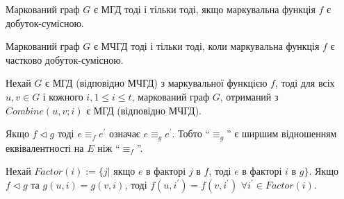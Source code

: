 \begin{lemma}
  Маркований граф $G$ є МГД тоді і тільки тоді, якщо маркувальна функція $f$ є добуток-сумісною. 
\end{lemma}

\begin{lemma}
  Маркований граф $G$ є МЧГД тоді і тільки тоді, коли маркувальна функція $f$ є частково добуток-сумісною.
\end{lemma}

\begin{lemma}
  Нехай $G$ є МГД (відповідно МЧГД) з маркувальної функцією $f$, тоді для всіх $u,v \in G$ і кожного $i, 1 \le i \le t$, маркований граф $G$, отриманий з $Combine(u,v;i)$ є МГД (відповідно МЧГД).
\end{lemma}

\begin{lemma}
  Якщо $f \triangleleft g$ тоді $e \equiv_f e^\prime$ означає $e \equiv_g e^\prime$. Тобто ``$\equiv_g$'' є ширшим відношенням еквівалентності на $E$ ніж ``$\equiv_f$''.
\end{lemma}

\begin{lemma}
  Нехай $Factor(i):=\lbrace j \vert$ якщо $e$ в факторі $j$ в $f$, тоді $e$ в факторі $i$ в $g \rbrace$. Якщо $f \triangleleft g$ та $g(u,i)=g(v,i)$, тоді $f(u,i^\prime)=f(v,i^\prime)$ $\forall i^\prime \in Factor(i)$.
\end{lemma}
